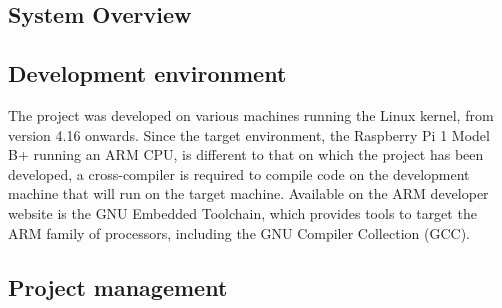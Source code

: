 \subsection{System Overview}
    

\subsection{Development environment}
    The project was developed on various machines running the Linux kernel, from
    version 4.16 onwards. Since the target environment, the Raspberry Pi 1 Model
    B+ running an ARM CPU, is different to that on which the project has been
    developed, a cross-compiler is required to compile code on the development
    machine that will run on the target machine. Available on the ARM developer
    website is the GNU Embedded Toolchain, which provides tools to target the
    ARM family of processors, including the GNU Compiler Collection (GCC).
\subsection{Project management}
